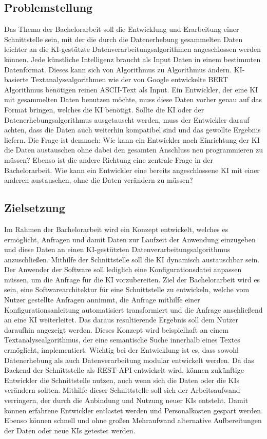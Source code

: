 \subsection{Problemstellung}
Das Thema der Bachelorarbeit soll die Entwicklung und Erarbeitung einer Schnittstelle sein, mit der die durch die Datenerhebung gesammelten Daten leichter an die KI-gestützte Datenverarbeitungsalgorithmen angeschlossen werden können. Jede künstliche Intelligenz braucht als Input Daten in einem bestimmten Datenformat. Dieses kann sich von Algorithmus zu Algorithmus ändern. KI-basierte Textanalysealgorithmen wie der von Google entwickelte BERT Algorithmus benötigen reinen ASCII-Text als Input. Ein Entwickler, der eine KI mit gesammelten Daten benutzen möchte, muss diese Daten vorher genau auf das Format bringen, welches die KI benötigt. Sollte die KI oder der Datenerhebungsalgorithmus ausgetauscht werden, muss der Entwickler darauf achten, dass die Daten auch weiterhin kompatibel sind und das gewollte Ergebnis liefern. Die Frage ist demnach: \glqq Wie kann ein Entwickler nach Einrichtung der KI die Daten austauschen ohne dabei den gesamten Anschluss neu programmieren zu müssen?\grqq{} Ebenso ist die andere Richtung eine zentrale Frage in der Bachelorarbeit. \glqq Wie kann ein Entwickler eine bereits angeschlossene KI mit einer anderen austauschen, ohne die Daten verändern zu müssen? \grqq{}

\subsection{Zielsetzung}
Im Rahmen der Bachelorarbeit wird ein Konzept entwickelt, welches es ermöglicht, Anfragen und damit Daten zur Laufzeit der Anwendung einzugeben und diese Daten an einen KI-gestützten Datenverarbeitungsalgorithmus anzuschließen. Mithilfe der Schnittstelle soll die KI dynamisch austauschbar sein. Der Anwender der Software soll lediglich eine Konfigurationsdatei anpassen müssen, um die Anfrage für die KI vorzubereiten. Ziel der Bachelorarbeit wird es sein, eine Softwarearchitektur für eine Schnittstelle zu entwickeln, welche vom Nutzer gestellte Anfragen annimmt, die Anfrage mithilfe einer Konfigurationsanleitung automatisiert transformiert und die Anfrage anschließend an eine KI weiterleitet. Das daraus resultierende Ergebnis soll dem Nutzer daraufhin angezeigt werden. Dieses Konzept wird beispielhaft an einem Textanalysealgorithmus, der eine semantische Suche innerhalb eines Textes ermöglicht, implementiert. Wichtig bei der Entwicklung ist es, dass sowohl Datenerhebung als auch Datenverarbeitung modular entwickelt werden. Da das Backend der Schnittstelle als REST-API entwickelt wird, können zukünftige Entwickler die Schnittstelle nutzen, auch wenn sich die Daten oder die KIs verändern sollten. Mithilfe dieser Schnittstelle soll sich der Arbeitsaufwand verringern, der durch die Anbindung und Nutzung neuer KIs entsteht. Damit können erfahrene Entwickler entlastet werden und Personalkosten gespart werden. Ebenso können schnell und ohne großen Mehraufwand alternative Aufbereitungen der Daten oder neue KIs getestet werden.

